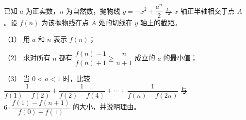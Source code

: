 \begin{question}
已知 $a$ 为正实数，$n$ 为自然数，抛物线 $y=-x^2+\dfrac{a^n}2$ 与 $x$ 轴正半轴相交于点 $A$。设 $f(n)$ 为该抛物线在点 $A$ 处的切线在 $y$ 轴上的截距。

（1） 用 $a$ 和 $n$ 表示 $f(n)$；

（2） 求对所有 $n$ 都有 $\dfrac{f(n)-1}{f(n)+1}\geqslant\dfrac{n}{n+1}$ 成立的 $a$ 的最小值；

（3） 当 $0<a<1$ 时，比较 $\dfrac1{f(1)-f(2)}+\dfrac1{f(2)-f(4)}+\cdots+\dfrac1{f(n)-f(2n)}$ 与 $6\cdot\dfrac{f(1)-f(n+1)}{f(0)-f(1)}$ 的大小，并说明理由。

\end{question}